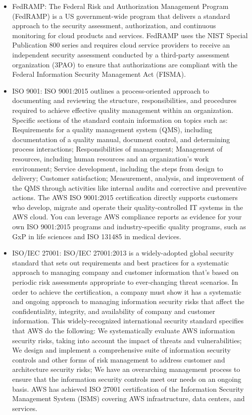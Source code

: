 \begin{itemize}
    \item FedRAMP: The Federal Risk and Authorization Management Program (FedRAMP) is a US government-wide program that delivers a standard approach to the security assessment, authorization, and continuous monitoring for cloud products and services. FedRAMP uses the NIST Special Publication 800 series and requires cloud service providers to receive an independent security assessment conducted by a third-party assessment organization (3PAO) to ensure that authorizations are compliant with the Federal Information Security Management Act (FISMA).
    \item ISO 9001: ISO 9001:2015 outlines a process-oriented approach to documenting and reviewing the structure, responsibilities, and procedures required to achieve effective quality management within an organization. Specific sections of the standard contain information on topics such as: Requirements for a quality management system (QMS), including documentation of a quality manual, document control, and determining process interactions; Responsibilities of management; Management of resources, including human resources and an organization's work environment; Service development, including the steps from design to delivery; Customer satisfaction; Measurement, analysis, and improvement of the QMS through activities like internal audits and corrective and preventive actions. The AWS ISO 9001:2015 certification directly supports customers who develop, migrate and operate their quality-controlled IT systems in the AWS cloud. You can leverage AWS compliance reports as evidence for your own ISO 9001:2015 programs and industry-specific quality programs, such as GxP in life sciences and ISO 131485 in medical devices. 
    \item ISO/IEC 27001: ISO/IEC 27001:2013 is a widely-adopted global security standard that sets out requirements and best practices for a systematic approach to managing company and customer information that's based on periodic risk assessments appropriate to ever-changing threat scenarios. In order to achieve the certification, a company must show it has a systematic and ongoing approach to managing information security risks that affect the confidentiality, integrity, and availability of company and customer information. This widely-recognized international security standard specifies that AWS do the following: We systematically evaluate AWS information security risks, taking into account the impact of threats and vulnerabilities; We design and implement a comprehensive suite of information security controls and other forms of risk management to address customer and architecture security risks; We have an overarching management process to ensure that the information security controls meet our needs on an ongoing basis. AWS has achieved ISO 27001 certification of the Information Security Management System (ISMS) covering AWS infrastructure, data centers, and services.

\end{itemize}
